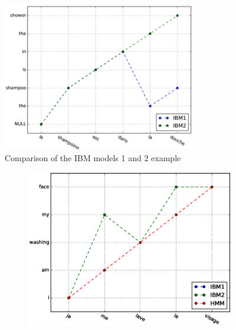 \documentclass[final]{beamer}
\begin{document}
\begin{frame}[t]
\begin{multicols}{3}
\begin{figure}
\centering
\includegraphics[width=0.85\columnwidth, height=.7\columnwidth]{figures/ibm1_2.png}
\caption{Comparison of the IBM models 1 and 2 example }
\label{fig:ibm}
\end{figure}
\begin{figure}
\centering
\begin{subfigure}{.99\columnwidth}
  \centering
  \includegraphics[width=.99\linewidth]{figures/figures_final/sentence3.eps}
\end{subfigure}%


\end{figure}
\end{multicols}
\end{frame}
\end{document}
